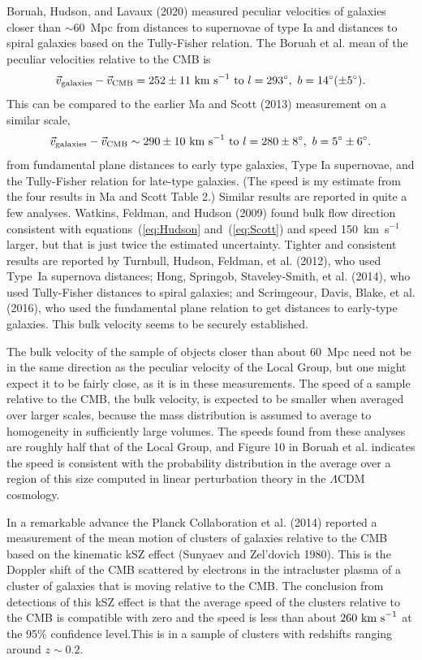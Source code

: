 \documentclass[fleqn,usenatbib]{mnras}
\newcommand{\beq}{\begin{equation}}
\newcommand{\eeq}{\end{equation}}
\begin{document}
Boruah, Hudson, and Lavaux (2020) measured peculiar velocities of galaxies closer than $\sim 60$~Mpc from distances to supernovae of type Ia and distances to spiral galaxies based on the Tully-Fisher relation. The Boruah et al. mean of the peculiar velocities relative to the CMB is 
\beq
{\vec v}_{\rm galaxies} - {\vec v}_{\rm CMB}= 252 \pm 11\hbox{ km s}^{-1}\hbox{ to } l = 293^\circ,\ b=14^\circ  (\pm 5^\circ).\label{eq:Hudson}
\eeq
This can be compared to the earlier Ma and Scott (2013) measurement on a similar scale, 
\beq
{\vec v}_{\rm galaxies} - {\vec v}_{\rm CMB}\sim 290\pm 10 \hbox{ km s}^{-1}\hbox{ to } l = 280\pm 8^\circ,\ b=5^\circ \pm 6^\circ.\label{eq:Scott}
\eeq
from fundamental plane distances to early type galaxies, Type Ia supernovae, and the Tully-Fisher relation for late-type galaxies. (The speed is my estimate from the four results in Ma and Scott Table 2.) Similar results are reported in quite a few analyses. Watkins, Feldman, and Hudson (2009) found bulk flow direction consistent with equations~(\ref{eq:Hudson} and~(\ref{eq:Scott}) and speed 150~km~s$^{-1}$ larger, but that is just twice the estimated uncertainty. Tighter and consistent results are reported by Turnbull, Hudson, Feldman, et al. (2012), who used Type~Ia supernova distances; Hong, Springob, Staveley-Smith, et al. (2014), who used Tully-Fisher distances to spiral galaxies; and Scrimgeour, Davis, Blake, et al. (2016), who used the fundamental plane relation to get distances to early-type galaxies. This bulk velocity seems to be securely established.

The bulk velocity of the sample of objects closer than about 60~Mpc need not be in the same direction as the peculiar velocity of the Local Group, but one might expect it to be fairly close, as it is in these measurements. The speed of a sample relative to the CMB, the bulk velocity, is expected to be smaller when averaged over larger scales, because the mass distribution is assumed to average to homogeneity in sufficiently large volumes. The speeds found from these analyses are roughly half that of the Local Group, and Figure 10 in Boruah et al. indicates the speed is consistent with the probability distribution in the average over a region of this size computed in linear perturbation theory in the $\Lambda$CDM cosmology.  

In a remarkable advance the Planck Collaboration et al. (2014) reported a measurement of the mean motion of clusters of galaxies relative to the CMB based on the kinematic  kSZ effect (Sunyaev and Zel'dovich 1980). This is the Doppler shift of the CMB scattered by electrons in the intracluster plasma of a cluster of galaxies that is moving relative to the CMB. The conclusion from detections of this kSZ effect is that the average speed of the clusters relative to the CMB is compatible with zero and the speed is less than about $260\hbox{ km s}^{-1}$ at the 95\% confidence level.This is in a sample of clusters with redshifts ranging around $z\sim 0.2$. 
\end{document}

